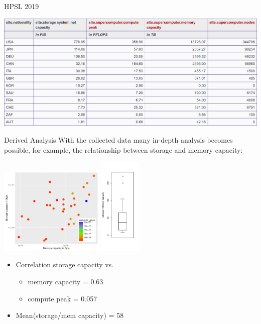 \documentclass[portrait,a0paper,fontscale=0.4]{baposter}
\newcommand{\compresslist}{%
\setlength{\itemsep}{1pt}%
\setlength{\parskip}{0pt}%
\setlength{\parsep}{0pt}%
}
\begin{document}
\begin{poster}
\begin{posterbox}[name=engineering,column=3]{HPSL 2019}
\vspace*{-1em}

\includegraphics[width=\textwidth]{capacity-grouped}

\end{posterbox}




\begin{posterbox}[name=awareness,column=3,below=engineering]{Derived Analysis}
With the collected data many in-depth analysis becomes possible, for example,
the relationship between storage and memory capacity:

\vspace*{-1em}

\includegraphics[width=5cm]{memstorage}
\includegraphics[width=2cm]{capacitymemory}

\vspace*{-2em}
\begin{itemize}\compresslist
\item Correlation storage capacity vs.
  \begin{itemize}\compresslist
  \item memory capacity = 0.63
  \item compute peak = 0.057
  \end{itemize}
\item Mean(storage/mem capacity) = 58
\end{itemize}


\end{posterbox}
\end{poster}
\end{document}
